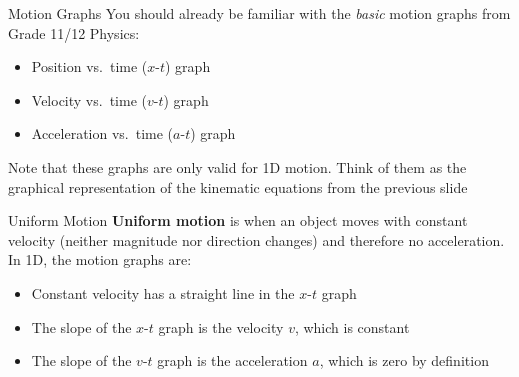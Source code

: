 \documentclass[12pt,compress,aspectratio=169]{beamer}
\begin{document}
\begin{frame}{Motion Graphs}
  You should already be familiar with the \emph{basic} motion graphs from Grade
  11/12 Physics:
  \begin{itemize}
  \item Position vs.\ time ($x$-$t$) graph
  \item Velocity vs.\ time ($v$-$t$) graph
  \item Acceleration vs.\ time ($a$-$t$) graph
  \end{itemize}
  Note that these graphs are only valid for 1D motion. Think of them as the
  graphical representation of the kinematic equations from the previous slide
\end{frame}



\begin{frame}{Uniform Motion}
  \textbf{Uniform motion} is when an object moves with constant velocity
  (neither magnitude nor direction changes) and therefore no acceleration. In
  1D, the motion graphs are:
  \begin{center}
    \hspace{.15in}
    \hspace{.15in}
  \end{center}
  \begin{itemize}
  \item Constant velocity has a straight line in the $x$-$t$ graph
  \item The slope of the $x$-$t$ graph is the velocity $v$, which is constant
  \item The slope of the $v$-$t$ graph is the acceleration $a$, which is zero by
    definition
  \end{itemize}
\end{frame}
\end{document}
